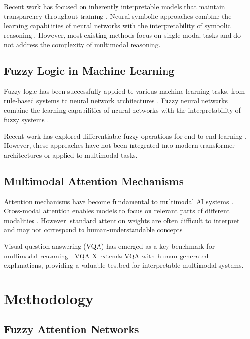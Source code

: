 \documentclass[manuscript,review,anonymous]{acmart}
\begin{document}
Recent work has focused on inherently interpretable models that maintain transparency throughout training \cite{rudin2019stop}. Neural-symbolic approaches combine the learning capabilities of neural networks with the interpretability of symbolic reasoning \cite{garcez2019neural}. However, most existing methods focus on single-modal tasks and do not address the complexity of multimodal reasoning.

\subsection{Fuzzy Logic in Machine Learning}

Fuzzy logic has been successfully applied to various machine learning tasks, from rule-based systems to neural network architectures \cite{castillo2007type}. Fuzzy neural networks combine the learning capabilities of neural networks with the interpretability of fuzzy systems \cite{mitra2002neuro}.

Recent work has explored differentiable fuzzy operations for end-to-end learning \cite{van2019differentiable}. However, these approaches have not been integrated into modern transformer architectures or applied to multimodal tasks.

\subsection{Multimodal Attention Mechanisms}

Attention mechanisms have become fundamental to multimodal AI systems \cite{vaswani2017attention}. Cross-modal attention enables models to focus on relevant parts of different modalities \cite{lu2019vilbert}. However, standard attention weights are often difficult to interpret and may not correspond to human-understandable concepts.

Visual question answering (VQA) has emerged as a key benchmark for multimodal reasoning \cite{antol2015vqa}. VQA-X \cite{park2018multimodal} extends VQA with human-generated explanations, providing a valuable testbed for interpretable multimodal systems.

\section{Methodology}

\subsection{Fuzzy Attention Networks}
\end{document}
